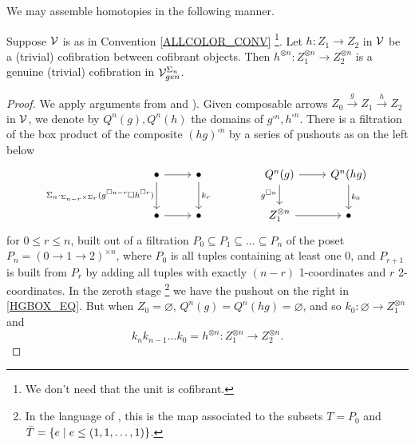\documentclass[a4paper,10pt
,draft
]{article}%
\renewcommand{\1}{\eta}%
\begin{document}
We may assemble homotopies in the following manner.

\begin{lemma}
      Suppose $\mathcal V$ is as in Convention \ref{ALLCOLOR_CONV} \footnote{
        We don't need that the unit is cofibrant.}.
      Let $h: Z_1 \to Z_2$ in $\mathcal V$ be a (trivial) cofibration between cofibrant objects.
      Then $h^{\otimes n}: Z_1^{\otimes n} \to Z_2^{\otimes n}$ is a genuine (trivial) cofibration in $\mathcal V^{\Sigma_n}_{gen}$.
\end{lemma}
\begin{proof}
      We apply arguments from \cite[Prop. 6.24]{BP_geo} and \cite[Lemma 4.8]{Pe16}).
      Given composable arrows $Z_0 \xrightarrow{g} Z_1 \xrightarrow{h} Z_2$ in $\mathcal V$,
      we denote by $Q^n(g), Q^n(h)$ the domains of $g^{\square n}, h^{\square n}$.
      There is a filtration of the box product of the composite $(hg)^{\square n}$ by a series of pushouts as on the left below
      \begin{equation}
            \label{HGBOX_EQ}
            \begin{tikzcd}
                  \bullet \arrow[d, "\Sigma_n \cdot_{\Sigma_{n-r} \times \Sigma_r} (g^{\square n-r} \square h^{\square r})"'] \arrow[r]
                  &
                  \bullet \arrow[d, "k_r"]
                  & &%
                  Q^n(g) \arrow[r] \arrow[d, "g^{\square n}"']
                  &
                  Q^n(hg) \arrow[d, "k_0"]
                  \\
                  \bullet \arrow[r]
                  &
                  \bullet
                  & &%
                  Z_1^{\otimes n} \arrow[r]
                  &
                  \bullet
            \end{tikzcd}
      \end{equation}
      for $0 \leq r \leq n$,
      built out of a filtration $P_0 \subseteq P_1 \subseteq \dots \subseteq P_n$ of the poset $P_n = (0 \to 1 \to 2)^{\times n}$,
      where $P_0$ is all tuples containing at least one 0, and
      $P_{r+1}$ is built from $P_r$ by adding all tuples with exactly $(n-r)$ 1-coordinates and $r$ 2-coordinates.
      In the zeroth stage \footnote{
        In the language of \cite[Lemma 4.8]{Pe16}, this is the map associated to the subsets
        $T = P_0$ and $\bar T = \left\{ e \;|\; e \leq (1,1,\dots,1)\right\}$.}
      we have the pushout on the right in \eqref{HGBOX_EQ}.
      But when $Z_0 = \varnothing$, $Q^n(g) = Q^n(hg) = \varnothing$, and so
      $k_0: \varnothing \to Z_1^{\otimes n}$ and
      \[
            k_n k_{n-1} \dots k_0 = h^{\otimes n}: Z_1^{\otimes n} \to Z_2^{\otimes n}.
      \]


\end{proof}
\end{document}

